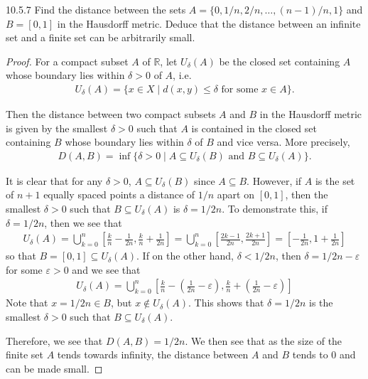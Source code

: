 \begin{problem}{10.5.7}
  Find the distance between the sets $A=\{0, 1/n, 2/n , \dots, (n-1)/n, 1\}$ and $B = [0,1]$
  in the Hausdorff metric. Deduce that the distance between an infinite set and a finite set can be arbitrarily small.
\end{problem}

\begin{proof}
  For a compact subset $A$ of $\mathbb{R}$, let $U_\delta(A)$ be the closed set
  containing $A$ whose boundary lies within $\delta >0$ of $A$, i.e.\
  \begin{align*}
    U_\delta(A) = \{x \in X \mid d(x, y) \leq \delta \text{ for some $x\in A$} \}.
  \end{align*}

  Then the distance between two compact subsets $A$ and $B$ in the Hausdorff metric is given by
  the smallest $\delta >0$ such that $A$ is contained in the closed set containing $B$ whose boundary lies
  within $\delta$ of $B$ and vice versa. More precisely,
  \begin{align}
    D(A, B) = \inf\{\delta > 0 \mid A \subseteq U_\delta(B) \text{ and } B \subseteq U_\delta(A)\}.
  \end{align}

  It is clear that for any $\delta > 0$, $A \subseteq U_\delta(B)$ since $A\subseteq B$.
  However, if $A$ is the set of $n + 1$ equally spaced points a distance of $1/n$ apart on $[0, 1]$,
  then the smallest $\delta > 0$ such that $B \subseteq U_\delta(A)$ is $\delta= 1 / 2n$.
  To demonstrate this, if $\delta = 1/ 2n$, then we see that
  \begin{align*}
    U_\delta(A) = \bigcup_{k=0}^n \left[\frac{k}{n} - \frac{1}{2n}, \frac{k}{n} + \frac{1}{2n}\right]
    = \bigcup_{k=0}^n \left[\frac{2k - 1}{2n}, \frac{2k + 1}{2n}\right] = \left[-\frac{1}{2n}, 1 + \frac{1}{2n}\right]
  \end{align*}
  so that $B = [0, 1] \subseteq U_\delta(A)$. If on the other hand,
  $\delta < 1/2n$, then $\delta = 1/2n - \varepsilon$ for some $\varepsilon > 0$
  and we see that
  \begin{align*}
    U_\delta(A) = \bigcup_{k=0}^n \left[\frac{k}{n} - \left(\frac{1}{2n} - \varepsilon\right), \frac{k}{n} + \left(\frac{1}{2n} - \varepsilon\right)\right]
  \end{align*}
  Note that $x = 1/2n \in B$, but $x \notin U_\delta(A)$. This shows that $\delta = 1/ 2n$
  is the smallest $\delta > 0$ such that $B \subseteq U_\delta(A)$.

  Therefore, we see that $D(A, B) = 1/ 2n$. We then see that
  as the size of the finite set $A$ tends towards infinity, the distance between
  $A$ and $B$ tends to 0 and can be made small.

\end{proof}
\newpage
